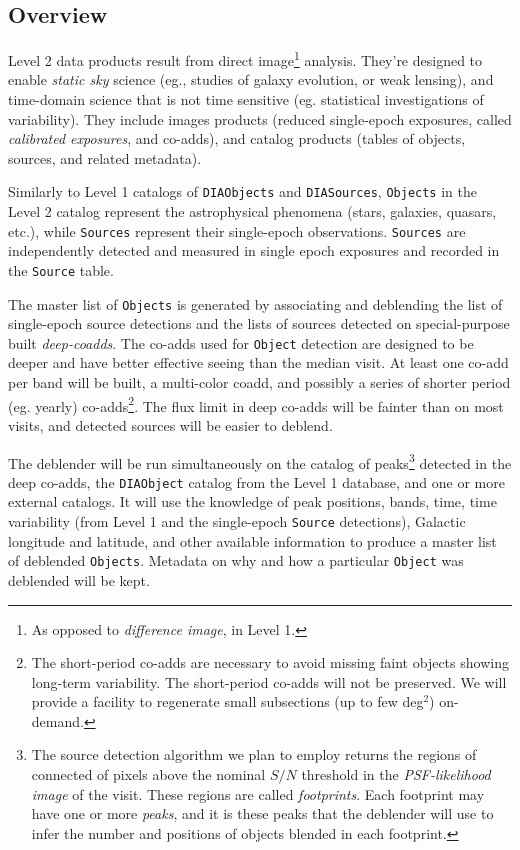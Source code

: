 \documentclass[12pt]{article}
\newcommand{\code}[1]{\texttt{#1}}
\newcommand{\DIASources}{\code{DIASources}\xspace}
\newcommand{\DIAObject}{\code{DIAObject}\xspace}
\newcommand{\DIAObjects}{\code{DIAObjects}\xspace}
\newcommand{\DB}{{Level 1 database}\xspace}
\newcommand{\Object}{\code{Object}\xspace}
\newcommand{\Objects}{\code{Objects}\xspace}
\newcommand{\Source}{\code{Source}\xspace}
\newcommand{\Sources}{\code{Sources}\xspace}
\begin{document}
\subsection{Overview}

Level 2 data products result from direct image\footnote{As opposed to {\em difference image}, in Level 1.} analysis. They're designed to enable {\em static sky} science (eg., studies of galaxy evolution, or weak lensing), and time-domain science that is not time sensitive (eg. statistical investigations of variability). They include images products (reduced single-epoch exposures, called {\em calibrated exposures}, and co-adds), and catalog products (tables of objects, sources, and related metadata).

\vspace{1em}

Similarly to Level 1 catalogs of \DIAObjects and \DIASources, \Objects in the Level 2 catalog represent the astrophysical phenomena (stars, galaxies, quasars, etc.), while \Sources represent their single-epoch observations. \Sources are independently detected and measured in single epoch exposures and recorded in the \Source table. 

The master list of \Objects is generated by associating and deblending the list of single-epoch source detections and the lists of sources detected on special-purpose built {\em deep-coadds}. The co-adds used for \Object detection are designed to be deeper and have better effective seeing than the median visit. At least one co-add per band will be built, a multi-color coadd, and possibly a series of shorter period (eg. yearly) co-adds\footnote{The short-period co-adds are necessary to avoid missing faint objects showing long-term variability. The short-period co-adds will not be preserved. We will provide a facility to regenerate small subsections (up to few deg$^2$) on-demand.}. The flux limit in deep co-adds will be fainter than on most visits, and detected sources will be easier to deblend.

The deblender will be run simultaneously on the catalog of peaks\footnote{The source detection algorithm we plan to employ returns the regions of connected of pixels above the nominal $S/N$ threshold in the {\em PSF-likelihood image} of the visit. These regions are called {\em footprints}. Each footprint may have one or more {\em peaks}, and it is these peaks that the deblender will use to infer the number and positions of objects blended in each footprint.} detected in the deep co-adds, the \DIAObject catalog from the \DB, and one or more external catalogs.  It will use the knowledge of peak positions, bands, time, time variability (from Level 1 and the single-epoch \Source detections), Galactic longitude and latitude, and other available information to produce a master list of deblended \Objects. Metadata on why and how a particular \Object was deblended will be kept.
\end{document}

